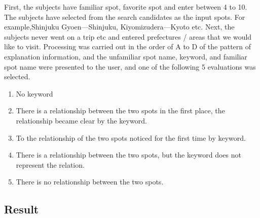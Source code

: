 \documentclass[journal]{IAENGtran}
\begin{document}
First, the subjects have familiar spot, favorite spot and enter between 4 to 10.
The subjects have selected from the search candidates as the input spots.
For example,Shinjuku Gyoen---Shinjuku, Kiyomizudera---Kyoto etc.
Next, the subjects never went on a trip etc and entered prefectures / areas that we would like to visit.
Processing was carried out in the order of A to D of the pattern of explanation information, and the unfamiliar spot name, keyword, and familiar spot name were presented to the user, and one of the following 5 evaluations was selected.
\begin{enumerate}
  \item No keyword
  \item There is a relationship between the two spots in the first place, the relationship became clear by the keyword.
  \item To the relationship of the two spots noticed for the first time by keyword.
  \item There is a relationship between the two spots, but the keyword does not represent the relation.
  \item There is no relationship between the two spots.
\end{enumerate}

\subsection{Result}
\label{subsec:Result}
\end{document}

